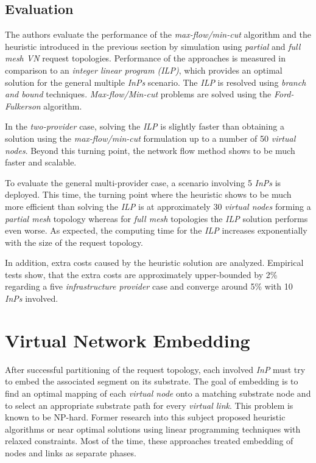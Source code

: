 \documentclass[prodmode,acmtomccap]{acmlarge}
\begin{document}
\subsection{Evaluation}
The authors evaluate the performance of the \emph{max-flow/min-cut} algorithm and the heuristic introduced in the previous section
by simulation using \emph{partial} and \emph{full mesh VN} request topologies. 
Performance of the approaches is measured in comparison to an \emph{integer linear program (ILP)}, which provides an optimal solution for the general multiple \emph{InPs} scenario.
The \emph{ILP} is resolved using \emph{branch and bound} techniques. \emph{Max-flow/Min-cut} problems are solved using the \emph{Ford-Fulkerson} algorithm.

In the \emph{two-provider} case, solving the \emph{ILP} is slightly faster than obtaining a solution using the \emph{max-flow/min-cut} formulation up to a number of
50 \emph{virtual nodes}. Beyond this turning point, the network flow method shows to be much faster and scalable.

To evaluate the general multi-provider case, a scenario involving 5 \emph{InPs} is deployed. This time, the turning point where the heuristic shows to be much more efficient than solving the \emph{ILP}
is at approximately 30 \emph{virtual nodes} forming a \emph{partial mesh} topology whereas for \emph{full mesh} topologies the \emph{ILP} solution performs even worse.
As expected, the computing time for the \emph{ILP} increases exponentially with the size of the request topology.

In addition, extra costs caused by the heuristic solution are analyzed. Empirical tests show, that the extra costs are approximately upper-bounded by 2\% regarding a five \emph{infrastructure provider} case and
converge around 5\% with 10 \emph{InPs} involved.

\section{Virtual Network Embedding}
\label{sec:embedding}
After successful partitioning of the request topology, each involved \emph{InP} must try to embed the associated segment on its substrate.
The goal of embedding is to find an optimal mapping of each \emph{virtual node} onto a matching substrate node and to select an appropriate substrate path for every \emph{virtual link}.
This problem is known to be NP-hard. Former research into this subject proposed heuristic algorithms or near optimal solutions using linear programming techniques with
relaxed constraints. Most of the time, these approaches treated embedding of nodes and links as separate phases.
\end{document}
